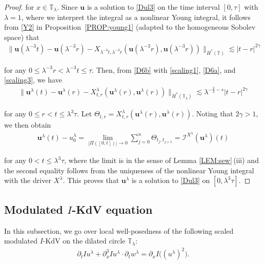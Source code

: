 \documentclass[letterpaper, 11pt,  reqno]{amsart}
\newcommand{\1}{\hspace{0.5mm}\text{I}\hspace{0.5mm}}
\newcommand{\I}{\mathcal{I}}
\newcommand{\noi}{\noindent}
\newcommand{\T}{\mathbb{T}}
\newcommand{\g}{\gamma}
\newcommand{\ld}{\lambda}
\newcommand{\dx}{\partial_x}
\newcommand{\dt}{\partial_t}
\newcommand{\les}{\lesssim}
\newcommand{\uu}{\mathbf{u}}
\newcommand{\Ta}{\Theta}
\numberwithin{equation}{section}
\numberwithin{theorem}{section}
\begin{document}
\begin{proof}
\noi
for $x \in \T_\ld$.
Since $\uu$ is a solution to \eqref{Dul3} 
on the time interval $[0, \tau]$
with $\ld = 1$, 
where we interpret
 the integral as a nonlinear Young integral, 
it follows from \eqref{Y2} in Proposition~\ref{PROP:young1} 
(adapted to the homogeneous Sobolev space) that 
\begin{align}
\| \uu(\ld^{-3}t) - \uu(\ld^{-3}r) 
- X_{\ld^{-3}t, \ld^{-3}r} ( \uu(\ld^{-3}r ) , \uu(\ld^{-3}r))  \|_{\dot H^s(\T)}
\les  |t-r|^{2\g}
\label{D6b}
\end{align}


\noi
for any $0\leq \ld^{-3}r<\ld^{-3}t\leq \tau$.
Then, from \eqref{D6b} with 
\eqref{scaling1}, \eqref{D6a}, and 
\eqref{scaling3}, we have
\begin{align*}
\|\uu^\ld(t) - \uu^\ld(r) - X^\ld_{t,r} (\uu^\ld(r), \uu^\ld (r))\|_{\dot H^s(\T_{\ld})}
\les \ld^{-\frac{3}{2}-s} |t-r|^{2\g}
\end{align*}


\noi
for any $0 \le r < t \le \ld^3 \tau$.
Let  $\Ta_{t, r} = X^\ld_{t,r} (\uu^\ld(r), \uu^\ld (r))$.
Noting that  $2\g > 1$, 
we then obtain 
\begin{align*}
\uu^\ld (t) - u_0^\ld  = \lim_{|\Pi([0,t])|\to 0} 
\sum^n_{j=0} \Theta_{t_j,t_{j+1}}
= \I^{X^\ld}(\uu^\ld)(t) 
\end{align*} 
 
 \noi
for any $0 < t \le \ld^3 \tau$,   where 
 the limit is in the sense of Lemma \ref{LEM:sew}\,(iii)
 and the second equality follows from the uniqueness
 of the nonlinear Young integral with the driver $X^\ld$.
This proves that 
 $\uu^\ld$ is a solution to \eqref{Dul3}
on $[0, \ld^3\tau]$.
\end{proof}






\subsection{Modulated $I$-KdV equation}
\label{SUBSEC:I2}

In this subsection, we go over  local well-posedness
of the following scaled modulated $I$-KdV
on the dilated circle $\T_\ld$:
\begin{align}
\dt I u^{\ld} +    \dx^3 I u^{\ld}
\cdot \dt  w^{\ld}
  =\partial_x I\big((u^{\ld} )^2\big). 
\label{kdv4}
\end{align}
\end{document}
